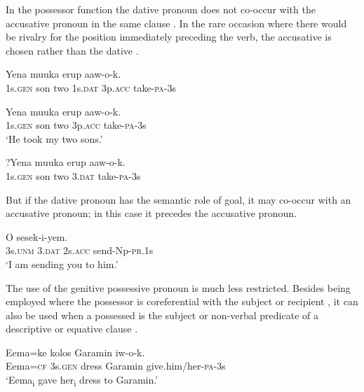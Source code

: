 In the possessor function the dative pronoun does not co-occur with the accusative pronoun in the same clause . In the rare occasion where there would be rivalry for the position immediately preceding the verb, the accusative is chosen  rather than the dative . 

\ea%
\label{ex:3:x584}
\gll *Yena muuka erup   aaw-o-k. \\
1s.\textsc{gen} son two 1s.\textsc{dat} 3p.\textsc{acc} take-\textsc{pa}-3s\\
\glt %
\z

\ea%
\label{ex:3:x583}
\gll Yena muuka erup  aaw-o-k. \\
1s.\textsc{gen} son two 3p.\textsc{acc} take-\textsc{pa}-3s\\
\glt`He took my two sons.'
\z

\ea%
\label{ex:3:x1928}
\gll ?Yena muuka erup  aaw-o-k. \\
1s.\textsc{gen} son two 3.\textsc{dat} take-\textsc{pa}-3s\\
\glt %
\z

But if the dative pronoun has the semantic role of goal, it may co-occur with an accusative pronoun; in this case it precedes the accusative pronoun.

\ea%
\label{ex:3:x1576}
\gll O   sesek-i-yem. \\
3s.\textsc{unm} 3.\textsc{dat} 2s.\textsc{acc} send-Np-\textsc{pr}.1s\\
\glt`I am sending you to him.'
\z

The use of the genitive possessive pronoun is much less restricted. Besides being employed where the possessor is coreferential with the subject  or recipient , it can also be used when a possessed  is the subject or non-verbal predicate of a descriptive or equative clause . 

\ea%
\label{ex:3:x589}
\gll Eema=ke  kolos Garamin iw-o-k. \\
Eema=\textsc{cf} 3s.\textsc{gen} dress Garamin give.him/her-\textsc{pa}-3s\\
\glt`Eema\textsubscript{i} gave her\textsubscript{i} dress to Garamin.'
\z


